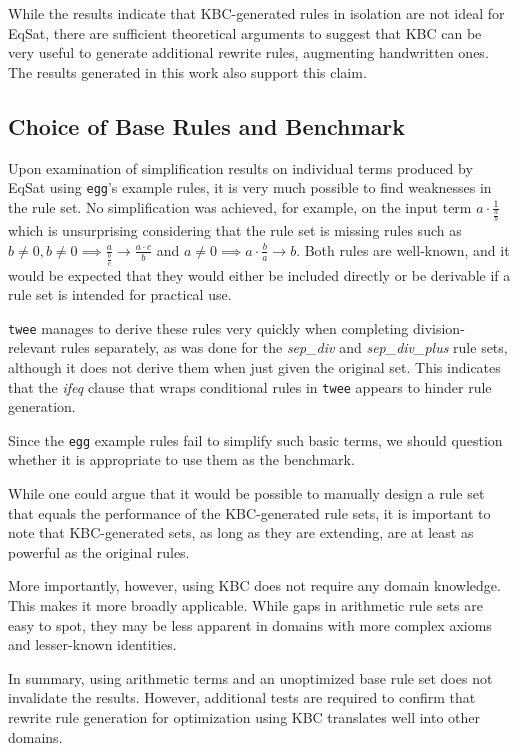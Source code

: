 While the results indicate that KBC-generated rules in isolation are not ideal for EqSat, there are sufficient theoretical arguments to suggest that KBC can be very useful to generate additional rewrite rules, augmenting handwritten ones. The results generated in this work also support this claim.

\subsection{Choice of Base Rules and Benchmark}
\label{sec:disuccion_base_rules}
Upon examination of simplification results on individual terms produced by EqSat using \texttt{egg}'s example rules, it is very much possible to find weaknesses in the rule set. No simplification was achieved, for example, on the input term $a \cdot \frac{1}{\frac{a}{b}}$ which is unsurprising considering that the rule set is missing rules such as $b \neq 0, b \neq 0 \implies \frac{a}{\frac{b}{c}} \to \frac{a \cdot c}{b}$ and $a \neq 0 \implies a \cdot \frac{b}{a} \to b$. Both rules are well-known, and it would be expected that they would either be included directly or be derivable if a rule set is intended for practical use.

\texttt{twee} manages to derive these rules very quickly when completing division-relevant rules separately, as was done for the \emph{sep\_div} and \emph{sep\_div\_plus} rule sets, although it does not derive them when just given the original set. This indicates that the \emph{ifeq} clause that wraps conditional rules in \texttt{twee} appears to hinder rule generation.

Since the \texttt{egg} example rules fail to simplify such basic terms, we should question whether it is appropriate to use them as the benchmark. 

While one could argue that it would be possible to manually design a rule set that equals the performance of the KBC-generated rule sets, it is important to note that KBC-generated sets, as long as they are extending, are at least as powerful as the original rules.

More importantly, however, using KBC does not require any domain knowledge. This makes it more broadly applicable. While gaps in arithmetic rule sets are easy to spot, they may be less apparent in domains with more complex axioms and lesser-known identities.

In summary, using arithmetic terms and an unoptimized base rule set does not invalidate the results. However, additional tests are required to confirm that rewrite rule generation for optimization using KBC translates well into other domains. 

